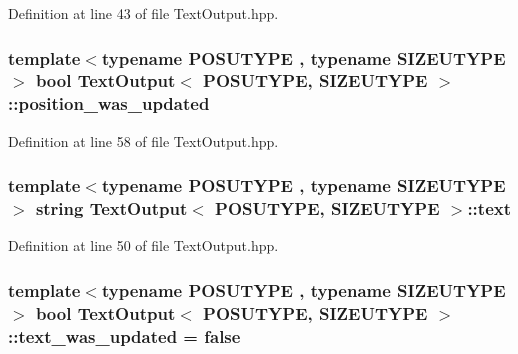 Definition at line 43 of file Text\-Output.\-hpp.

\hypertarget{class_text_output_a51e0f91233dbf52332b3562ab72aca28}{
\subsubsection[{position\-\_\-was\-\_\-updated}]{\setlength{\rightskip}{0pt plus 5cm}template$<$typename P\-O\-S\-U\-T\-Y\-P\-E , typename S\-I\-Z\-E\-U\-T\-Y\-P\-E $>$ bool {\bf Text\-Output}$<$ P\-O\-S\-U\-T\-Y\-P\-E, S\-I\-Z\-E\-U\-T\-Y\-P\-E $>$\-::position\-\_\-was\-\_\-updated\hspace{0.3cm}{\ttfamily [protected]}}}\label{class_text_output_a51e0f91233dbf52332b3562ab72aca28}


Definition at line 58 of file Text\-Output.\-hpp.

\hypertarget{class_text_output_aa63e4c0936ed44ad8658f9567acd437b}{
\subsubsection[{text}]{\setlength{\rightskip}{0pt plus 5cm}template$<$typename P\-O\-S\-U\-T\-Y\-P\-E , typename S\-I\-Z\-E\-U\-T\-Y\-P\-E $>$ string {\bf Text\-Output}$<$ P\-O\-S\-U\-T\-Y\-P\-E, S\-I\-Z\-E\-U\-T\-Y\-P\-E $>$\-::text\hspace{0.3cm}{\ttfamily [protected]}}}\label{class_text_output_aa63e4c0936ed44ad8658f9567acd437b}


Definition at line 50 of file Text\-Output.\-hpp.

\hypertarget{class_text_output_a01eda9d47821115d2389cc874867f2f5}{
\subsubsection[{text\-\_\-was\-\_\-updated}]{\setlength{\rightskip}{0pt plus 5cm}template$<$typename P\-O\-S\-U\-T\-Y\-P\-E , typename S\-I\-Z\-E\-U\-T\-Y\-P\-E $>$ bool {\bf Text\-Output}$<$ P\-O\-S\-U\-T\-Y\-P\-E, S\-I\-Z\-E\-U\-T\-Y\-P\-E $>$\-::text\-\_\-was\-\_\-updated = false\hspace{0.3cm}{\ttfamily [protected]}}}\label{class_text_output_a01eda9d47821115d2389cc874867f2f5}


